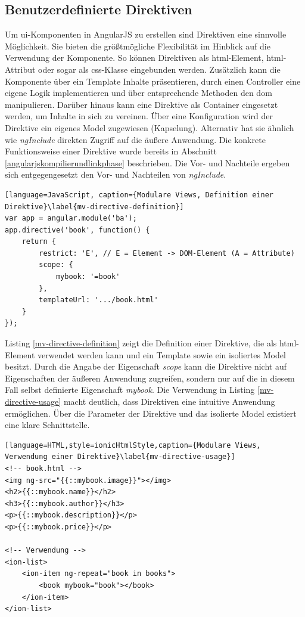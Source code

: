 \subsection{Benutzerdefinierte Direktiven}
Um \gls{ui}-Komponenten in AngularJS zu erstellen sind Direktiven eine sinnvolle Möglichkeit. Sie bieten die größtmögliche Flexibilität im Hinblick auf die Verwendung der Komponente. So können Direktiven als \gls{html}-Element, \gls{html}-Attribut oder sogar als \gls{css}-Klasse eingebunden werden. Zusätzlich kann die Komponente über ein \gls{Template} Inhalte präsentieren, durch einen Controller eine eigene Logik implementieren und über entsprechende Methoden den \gls{dom} manipulieren. Darüber hinaus kann eine Direktive als Container eingesetzt werden, um Inhalte in sich zu vereinen. Über eine Konfiguration wird der Direktive ein eigenes Model zugewiesen (Kapselung). Alternativ hat sie ähnlich wie \emph{ngInclude} direkten Zugriff auf die äußere Anwendung. Die konkrete Funktionsweise einer Direktive wurde bereits in Abschnitt \ref{angularjskompilierundlinkphase} beschrieben. Die Vor- und Nachteile ergeben sich entgegengesetzt den Vor- und Nachteilen von \emph{ngInclude}. 
\begin{lstlisting}[language=JavaScript, caption={Modulare Views, Definition einer Direktive}\label{mv-directive-definition}]
var app = angular.module('ba');
app.directive('book', function() {
	return {
		restrict: 'E', // E = Element -> DOM-Element (A = Attribute)
		scope: {
			mybook: '=book'
		},
		templateUrl: '.../book.html'
	}
});
\end{lstlisting}
Listing \ref{mv-directive-definition} zeigt die Definition einer Direktive, die als \gls{html}-Element verwendet werden kann und ein \gls{Template} sowie ein isoliertes Model besitzt. Durch die Angabe der Eigenschaft \emph{scope} kann die Direktive nicht auf Eigenschaften der äußeren Anwendung zugreifen, sondern nur auf die in diesem Fall selbst definierte Eigenschaft \emph{mybook}. Die Verwendung in Listing \ref{mv-directive-usage} macht deutlich, dass Direktiven eine intuitive Anwendung ermöglichen. Über die Parameter der Direktive und das isolierte Model existiert eine klare Schnittstelle. 
\begin{lstlisting}[language=HTML,style=ionicHtmlStyle,caption={Modulare Views, Verwendung einer Direktive}\label{mv-directive-usage}]
<!-- book.html -->
<img ng-src="{{::mybook.image}}"></img>
<h2>{{::mybook.name}}</h2>
<h3>{{::mybook.author}}</h3>
<p>{{::mybook.description}}</p>
<p>{{::mybook.price}}</p>

<!-- Verwendung -->
<ion-list>
	<ion-item ng-repeat="book in books">
		<book mybook="book"></book>
	</ion-item>
</ion-list>
\end{lstlisting}
		
